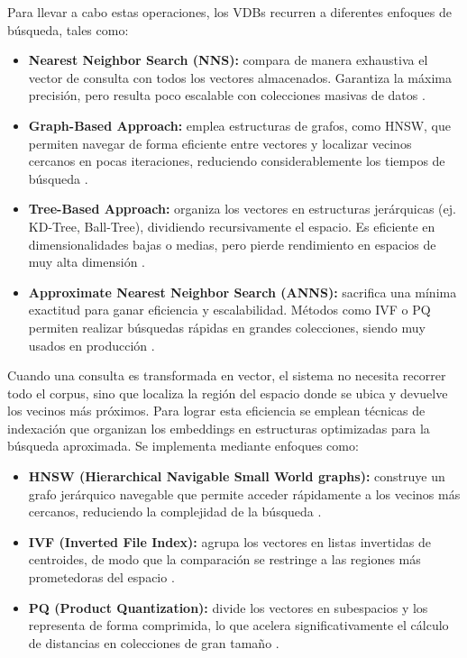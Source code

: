 Para llevar a cabo estas operaciones, los VDBs recurren a diferentes enfoques de búsqueda, tales como:

\begin{itemize}
    \item \textbf{Nearest Neighbor Search (NNS):} compara de manera exhaustiva el vector de consulta con todos los vectores almacenados. Garantiza la máxima precisión,
    pero resulta poco escalable con colecciones masivas de datos \parencite{ma2025vector}.
    
    \item \textbf{Graph-Based Approach:} emplea estructuras de grafos, como HNSW, que permiten navegar de forma eficiente entre vectores y localizar vecinos cercanos 
    en pocas iteraciones, reduciendo considerablemente los tiempos de búsqueda \parencite{jing2024vecdb}.
    
    \item \textbf{Tree-Based Approach:} organiza los vectores en estructuras jerárquicas (ej. KD-Tree, Ball-Tree), dividiendo recursivamente el espacio. Es eficiente 
    en dimensionalidades bajas o medias, pero pierde rendimiento en espacios de muy alta dimensión \parencite{fan2021pretraining}.
    
    \item \textbf{Approximate Nearest Neighbor Search (ANNS):} sacrifica una mínima exactitud para ganar eficiencia y escalabilidad. Métodos como IVF o PQ permiten 
    realizar búsquedas rápidas en grandes colecciones, siendo muy usados en producción \parencite{ma2025vector}.
\end{itemize}

Cuando una consulta es transformada en vector, el sistema no necesita recorrer todo el corpus, sino que localiza la región del espacio donde se ubica y 
devuelve los vecinos más próximos. Para lograr esta eficiencia se emplean técnicas de indexación que organizan los embeddings en estructuras optimizadas para 
la búsqueda aproximada. Se implementa mediante enfoques como:
\begin{itemize}
    \item \textbf{HNSW (Hierarchical Navigable Small World graphs):} construye un grafo jerárquico navegable que permite acceder rápidamente a los vecinos más cercanos, reduciendo la complejidad de la búsqueda \parencite{ma2025vector}.
    \item \textbf{IVF (Inverted File Index):} agrupa los vectores en listas invertidas de centroides, de modo que la comparación se restringe a las regiones más prometedoras del espacio \parencite{ma2025vector}.
    \item \textbf{PQ (Product Quantization):} divide los vectores en subespacios y los representa de forma comprimida, lo que acelera significativamente el cálculo de distancias en colecciones de gran tamaño \parencite{ma2025vector}.
\end{itemize}

